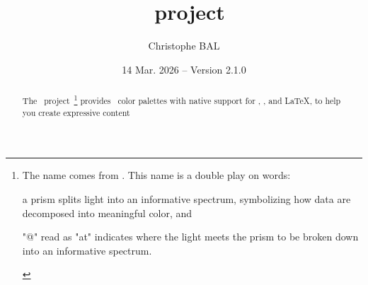 \documentclass{tutodoc}
\begin{document}
\title{\thisproj*\ project}
\author{Christophe BAL}
\date{14 Mar. 2026 -- Version 2.1.0}

\maketitle

\begin{abstract}
    The \thisproj\ project\,%
    \footnote{
        The name comes from .
        This name is a double play on words:\kern3pt%
        \begin{enumerate*}[label={[\arabic*]}]
            \item a prism splits light into an informative spectrum, symbolizing how data are decomposed into meaningful color,
            and
            \item "@" read as "at" indicates where the light meets the prism to be broken down into an informative spectrum.
        \end{enumerate*}
    }
    provides \nbOfPals\ color palettes with native support for \css, \lua, and \LaTeX, to help you create expressive content

%
\end{abstract}

\tdocsep
\end{document}
